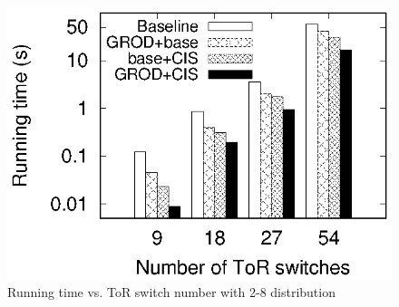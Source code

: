 \begin{figure}
\begin{minipage}[c]{0.23\textwidth}
\includegraphics[width=1\textwidth]{28_count_time_histogram.eps}
\caption{Running time vs. ToR switch number with 2-8 distribution}\label{fig:28_count_time_histogram}
\end{minipage}
\vspace{-0.3cm}


\end{figure}

